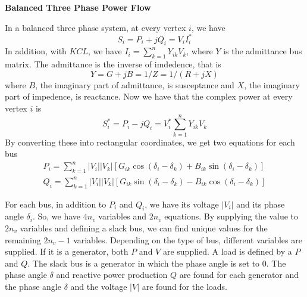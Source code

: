 \textbf{Balanced Three Phase Power Flow}

In a balanced three phase system, at every vertex $i$, we have
\begin{equation}
S_i = P_i + j Q_i = V_i I_i^*
\end{equation}
In addition, with $KCL$, we have $I_i = \sum_{k=1}^n Y_{ik} V_k$, where $Y$ is the admittance bus matrix.  The admittance is the inverse of imdedence, that is
\begin{equation}
Y = G + j B = 1/Z = 1/(R + jX) 
\end{equation}
where $B$, the imaginary part of admittance, is susceptance and $X$, the imaginary part of impedence, is reactance.  Now we have that the complex power at every vertex $i$ is
\begin{equation}
S_i^* = P_i - j Q_i = V_i^* \sum_{k=1}^n Y_{ik} V_k
\end{equation}
By converting these into rectangular coordinates, we get two equations for each bus
\begin{align} \label{ac-pf}
P_i = \sum_{k=1}^n |V_i| |V_k| \left[ G_{ik} \cos (\delta_i - \delta_k) + B_{ik} \sin (\delta_i - \delta_k) \right]  \\
Q_i = \sum_{k=1}^n |V_i| |V_k| \left[ G_{ik} \sin (\delta_i - \delta_k) - B_{ik} \cos (\delta_i - \delta_k) \right]  
\end{align}

For each bus, in addition to $P_i$ and $Q_i$,  we have its voltage $|V_i|$ and its phase angle $\delta_i$.  So, we have $4 n_v$ variables and $2 n_v$ equations.  By supplying the value to $2 n_v$ variables and defining a slack bus, we can find unique values for the remaining $2n_v - 1 $ variables.  Depending on the type of bus, different variables are supplied.  If it is a generator, both $P$  and $V$ are supplied.  A load is defined by a $P$ and $Q$.  The slack bus is a generator in which the phase angle is set to 0.  The phase angle $\delta$ and reactive power production $Q$ are found for each generator and the phase angle $\delta$ and the voltage $|V|$ are found for the loads.
